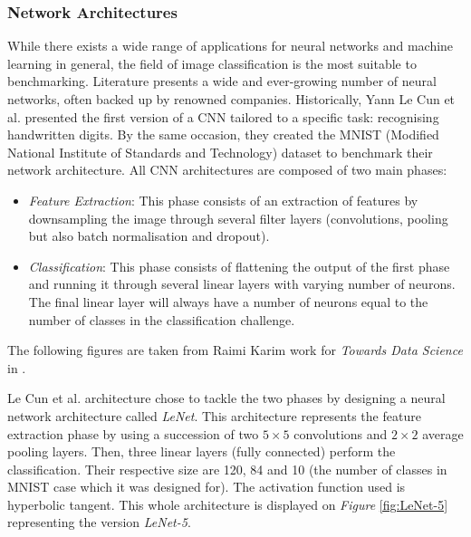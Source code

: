 
\subsubsection{Network Architectures}

While there exists a wide range of applications for neural networks and machine learning in general, the field of image classification is the most suitable to benchmarking. Literature presents a wide and ever-growing number of neural networks, often backed up by renowned companies. Historically, Yann Le Cun et al. \cite{LeCun1998} presented the first version of a CNN tailored to a specific task: recognising handwritten digits. By the same occasion, they created the MNIST (Modified National Institute of Standards and Technology) dataset to benchmark their network architecture. All CNN architectures are composed of two main phases:
\begin{itemize}
  \item \emph{Feature Extraction}: This phase consists of an extraction of features by downsampling the image through several filter layers (convolutions, pooling but also batch normalisation and dropout).
  \item \emph{Classification}: This phase consists of flattening the output of the first phase and running it through several linear layers with varying number of neurons. The final linear layer will always have a number of neurons equal to the number of classes in the classification challenge.
\end{itemize}

The following figures are taken from Raimi Karim work for \emph{Towards Data Science} in \cite{Karim2020}.

Le Cun et al. \cite{LeCun1998} architecture chose to tackle the two phases by designing a neural network architecture called \emph{LeNet}. This architecture represents the feature extraction phase by using a succession of two $5 \times 5$ convolutions and $2 \times 2$ average pooling layers. Then, three linear layers (fully connected) perform the classification. Their respective size are 120, 84 and 10 (the number of classes in MNIST \cite{LeCun2010} case which it was designed for). The activation function used is hyperbolic tangent. This whole architecture is displayed on \emph{Figure} \ref{fig:LeNet-5} representing the version \emph{LeNet-5}.

